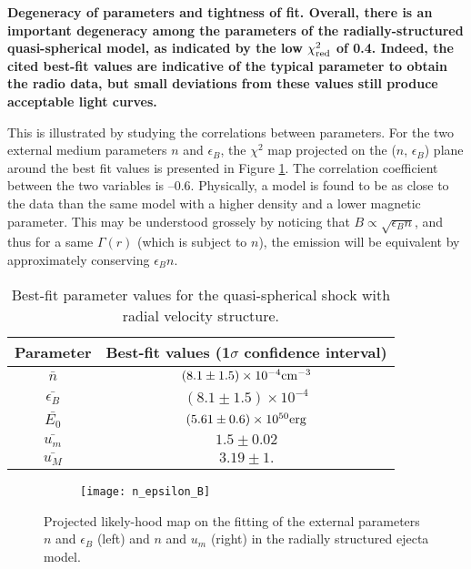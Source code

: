 \bf{Degeneracy of parameters and tightness of fit. }Overall, there is an important degeneracy among the parameters of the radially-structured quasi-spherical model, as indicated by the low $\chi^2_{\rm{red}}$ of 0.4. Indeed, the cited best-fit values are indicative of the typical parameter to obtain the radio data, but small deviations from these values still produce acceptable light curves.

This is illustrated by studying the correlations between parameters. For the two external medium parameters $n$ and $\epsilon_B$, the $\chi^2$ map projected on the ($n$, $\epsilon_B$) plane around the best fit values is presented in Figure \ref{n_epsilon_B}. The correlation coefficient between the two variables is --0.6. Physically, a model is found to be as close to the data than the same model with a higher density and a lower magnetic parameter. This may be understood grossely by noticing that $B \propto \sqrt{\epsilon_B n}$, and thus for a same $\Gamma(r)$ (which is subject to $n$), the emission will be equivalent by approximately conserving $\epsilon_B n$.

\begin{table}
\begin{center}
\begin{tabular}{c|c}
\bf{Parameter} & \bf{Best-fit values (1$\sigma$ confidence interval)}\\
\hline
$\bar{n}$ & $(8.1\pm1.5) \times 10^{-4} \rm{cm}^{-3}$ \\
$\bar{\epsilon_B}$ & $(8.1\pm1.5) \times 10^{-4} $ \\
$\bar{E_0}$ & $(5.61\pm0.6) \times 10^{50} \rm{erg}$ \\
$\bar{u_m}$ & $1.5\pm0.02$ \\
$\bar{u_M}$ & $3.19\pm1.$ \\
\end{tabular}
\end{center}
\caption{Best-fit parameter values for the quasi-spherical shock with radial velocity structure.}
\label{cocoon}
\end{table}

\begin{figure}
\centering
\begin{subfigure}
    \centering
    \texttt{[image: n\_epsilon\_B]}
\end{subfigure}%
\begin{subfigure}
    \texttt{[image: umn]}
\end{subfigure}
\caption{Projected likely-hood map on the fitting of the external parameters $n$ and $\epsilon_B$ (left) and $n$ and $u_m$ (right) in the radially structured ejecta model.}
\label{n_epsilon_B}
\end{figure}


